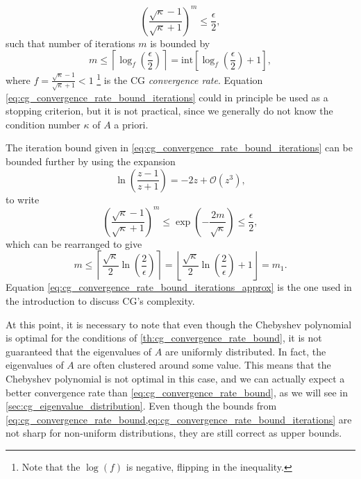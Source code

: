 \begin{equation*}
  \left(\frac{\sqrt{\kappa} - 1}{\sqrt{\kappa} + 1}\right)^{m} \leq \frac{\epsilon}{2},
\end{equation*}
such that number of iterations $m$ is bounded by
\begin{equation}
  m \leq \left\lceil\log_f\left(\frac{\epsilon}{2}\right)\right\rceil = \textrm{int}\left[\log_f\left(\frac{\epsilon}{2}\right) + 1\right],
  \label{eq:cg_convergence_rate_bound_iterations}
\end{equation}
where $f = \frac{\sqrt{\kappa} - 1}{\sqrt{\kappa} + 1} < 1$ \footnote{Note that the $\log(f)$ is negative, flipping in the inequality.} is the CG \textit{convergence rate}. Equation \ref{eq:cg_convergence_rate_bound_iterations} could in principle be used as a stopping criterion, but it is not practical, since we generally do not know the condition number $\kappa$ of $A$ a priori.

The iteration bound given in \cref{eq:cg_convergence_rate_bound_iterations} can be bounded further by using the expansion
\[
  \ln\left(\frac{z - 1}{z + 1}\right) = -2z + \mathcal{O}(z^3),
\]
to write
\[
  \left(\frac{\sqrt{\kappa} - 1}{\sqrt{\kappa} + 1}\right)^{m} \leq \exp \left(-\frac{2m}{\sqrt{\kappa}}\right) \leq \frac{\epsilon}{2},
\]
which can be rearranged to give
\begin{equation}
    m \leq \left\lceil\frac{\sqrt{\kappa}}{2}\ln\left(\frac{2}{\epsilon}\right)\right\rceil = \left\lfloor\frac{\sqrt{\kappa}}{2}\ln\left(\frac{2}{\epsilon}\right) + 1\right\rfloor = m_1.
  \label{eq:cg_convergence_rate_bound_iterations_approx}
\end{equation}
Equation \ref{eq:cg_convergence_rate_bound_iterations_approx} is the one used in the introduction to discuss CG's complexity.

At this point, it is necessary to note that even though the Chebyshev polynomial is optimal for the conditions of \cref{th:cg_convergence_rate_bound}, it is not guaranteed that the eigenvalues of $A$ are uniformly distributed. In fact, the eigenvalues of $A$ are often clustered around some value. This means that the Chebyshev polynomial is not optimal in this case, and we can actually expect a better convergence rate than \cref{eq:cg_convergence_rate_bound}, as we will see in \cref{sec:cg_eigenvalue_distribution}. Even though the bounds from \cref{eq:cg_convergence_rate_bound,eq:cg_convergence_rate_bound_iterations} are not sharp for non-uniform distributions, they are still correct as upper bounds.

